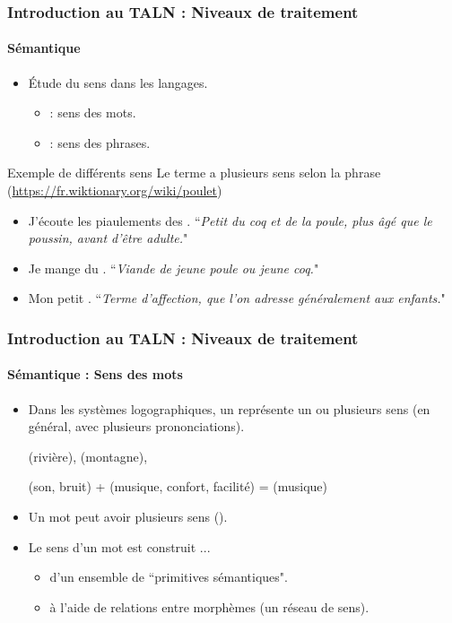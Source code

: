 \documentclass[xcolor=table]{beamer}
\begin{document}
\begin{frame}
\frametitle{Introduction au TALN : Niveaux de traitement}
\framesubtitle{Sémantique}

\begin{itemize}
	\item Étude du sens dans les langages.
	\begin{itemize}
		\item {} : sens des mots.
		\item {} : sens des phrases.
	\end{itemize}
\end{itemize}

\begin{exampleblock}{Exemple de différents sens}
	Le terme  a plusieurs sens selon la phrase (\url{https://fr.wiktionary.org/wiki/poulet})
	\begin{itemize}
		\item J'écoute les piaulements des . ``\textit{Petit du coq et de la poule, plus âgé que le poussin, avant d'être adulte.}"
		\item Je mange du . ``\textit{Viande de jeune poule ou jeune coq.}"
		\item Mon petit . ``\textit{Terme d'affection, que l'on adresse généralement aux enfants.}"
	\end{itemize}
	
\end{exampleblock}

\end{frame}

\begin{frame}
\frametitle{Introduction au TALN : Niveaux de traitement}
\framesubtitle{Sémantique : Sens des mots}

\begin{itemize}
	\item Dans les systèmes logographiques, un  représente un ou plusieurs sens (en général, avec plusieurs prononciations).
	
	\begin{CJK}{UTF8}{min}
		 (rivière),  (montagne), 
		
		 (son, bruit) +  (musique, confort, facilité) =  (musique)
	\end{CJK}

	\item Un mot peut avoir plusieurs sens ().
	\item Le sens d'un mot est construit ...
	\begin{itemize}
		\item d'un ensemble de ``primitives sémantiques".
		\item à l'aide de relations entre morphèmes (un réseau de sens).
	\end{itemize}
\end{itemize}

\end{frame}
\end{document}
